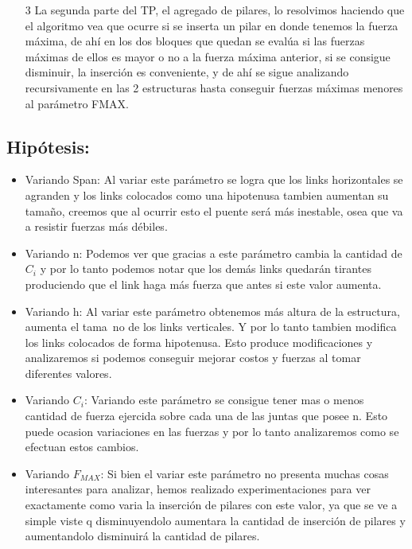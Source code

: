 \begin{itemize}
\item[3] La segunda parte del TP, el agregado de pilares, lo resolvimos haciendo que el algoritmo vea que ocurre si se inserta un pilar en donde tenemos la fuerza m\'axima, de ah\'i en los dos bloques que quedan se eval\'ua si las fuerzas m\'aximas de ellos es mayor o no a la fuerza m\'axima anterior, si se consigue disminuir, la inserci\'on es conveniente, y de ah\'i se sigue analizando recursivamente en las 2 estructuras hasta conseguir fuerzas m\'aximas menores al parámetro FMAX.\newline

\end{itemize}

\subsection{Hip\'otesis:}

\begin{itemize}

\item Variando Span: Al variar este par\'ametro se logra que los links horizontales se agranden y los links colocados como una hipotenusa tambien aumentan su tama\~{n}o, creemos que al ocurrir esto el puente ser\'a m\'as inestable, osea que va a resistir fuerzas m\'as d\'ebiles.

\item Variando n: Podemos ver que gracias a este par\'ametro cambia la cantidad de $C_i$ y por lo tanto podemos notar que los dem\'as links quedar\'an tirantes produciendo que el link haga m\'as fuerza que antes si este valor aumenta.

\item Variando h: Al variar este par\'ametro obtenemos m\'as altura de la estructura, aumenta el tama~{n}o de los links verticales. Y por lo tanto tambien modifica los links colocados de forma hipotenusa. Esto produce modificaciones y analizaremos si podemos conseguir mejorar costos y fuerzas al tomar diferentes valores.

\item Variando $C_i$: Variando este par\'ametro se consigue tener mas o menos cantidad de fuerza ejercida sobre cada una de las juntas que posee n. Esto puede ocasion variaciones en las fuerzas y por lo tanto analizaremos como se efectuan estos cambios.

\item Variando $F_{MAX}$: Si bien el variar este par\'ametro no presenta muchas cosas interesantes para analizar, hemos realizado experimentaciones para ver exactamente como varia la inserci\'on de pilares con este valor, ya que se ve a simple viste q disminuyendolo aumentara la cantidad de inserci\'on de pilares y aumentandolo disminuir\'a la cantidad de pilares.

\end{itemize}

